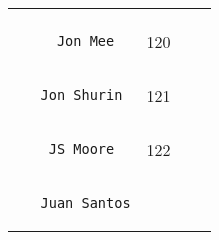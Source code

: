 \documentclass[]{article}
\begin{document}
\begin{longtable}[c]{@{}llll@{}}
\begin{minipage}[t]{0.15\columnwidth}
\end{minipage}
\\\noalign{\medskip}
\begin{minipage}[t]{0.39\columnwidth}\raggedright
\begin{verbatim}
     Jon Mee
\end{verbatim}
\end{minipage} & \begin{minipage}[t]{0.10\columnwidth}\raggedright
120
\end{minipage} & \begin{minipage}[t]{0.13\columnwidth}\raggedright
\end{minipage} & \begin{minipage}[t]{0.15\columnwidth}\raggedright
\end{minipage}
\\\noalign{\medskip}
\begin{minipage}[t]{0.39\columnwidth}\raggedright
\begin{verbatim}
   Jon Shurin
\end{verbatim}
\end{minipage} & \begin{minipage}[t]{0.10\columnwidth}\raggedright
121
\end{minipage} & \begin{minipage}[t]{0.13\columnwidth}\raggedright
\end{minipage} & \begin{minipage}[t]{0.15\columnwidth}\raggedright
\end{minipage}
\\\noalign{\medskip}
\begin{minipage}[t]{0.39\columnwidth}\raggedright
\begin{verbatim}
    JS Moore
\end{verbatim}
\end{minipage} & \begin{minipage}[t]{0.10\columnwidth}\raggedright
122
\end{minipage} & \begin{minipage}[t]{0.13\columnwidth}\raggedright
\end{minipage} & \begin{minipage}[t]{0.15\columnwidth}\raggedright
\end{minipage}
\\\noalign{\medskip}
\begin{minipage}[t]{0.39\columnwidth}\raggedright
\begin{verbatim}
   Juan Santos

\end{verbatim}
\end{minipage}
\end{longtable}
\end{document}
